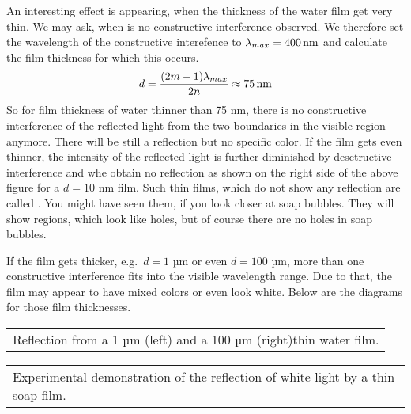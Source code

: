 \documentclass[letterpaper,10pt,english]{sphinxmanual}
\begin{document}
An interesting effect is appearing, when the thickness of the water film get very thin. We may ask, when is no constructive interference observed. We therefore set the wavelength of the constructive interefence to \(\lambda_{max}=400\, {\rm nm}\) and calculate the film thickness for which this occurs.
\begin{equation*}
\begin{split}d=\frac{(2m-1)\lambda_{max}}{2n}\approx 75\, {\rm nm}\end{split}
\end{equation*}
So for film thickness of water thinner than 75 nm, there is no constructive interference of the reflected light from the two boundaries in the visible region anymore. There will be still a reflection but no specific color. If the film gets even thinner, the intensity of the reflected light is further diminished by desctructive interference and whe obtain no reflection as shown on the right side of the above figure for a \(d=10\) nm film. Such thin films, which do not show any reflection are
called . You might have seen them, if you look closer at soap bubbles. They will show regions, which look like holes, but of course there are no holes in soap bubbles.

If the film gets thicker, e.g. \(d=1\) µm or even \(d=100\) µm, more than one constructive interference fits into the visible wavelength range. Due to that, the film may appear to have mixed colors or even look white. Below are the diagrams for those film thicknesses.


\begin{savenotes}\sphinxattablestart
\centering
\begin{tabulary}{\linewidth}[t]{|T|}
\hline
\sphinxstyletheadfamily 
{} 
\\
\hline
{} Reflection from a 1 µm (left) and a 100 µm (right)thin water film.
\\
\hline
\end{tabulary}
\par
\sphinxattableend\end{savenotes}


\begin{savenotes}\sphinxattablestart
\centering
\begin{tabulary}{\linewidth}[t]{|T|}
\hline
\sphinxstyletheadfamily 
{} 
\\
\hline
{} Experimental demonstration of the reflection of white light by a thin soap film.
\\
\hline
\end{tabulary}
\par
\sphinxattableend\end{savenotes}
\end{document}
